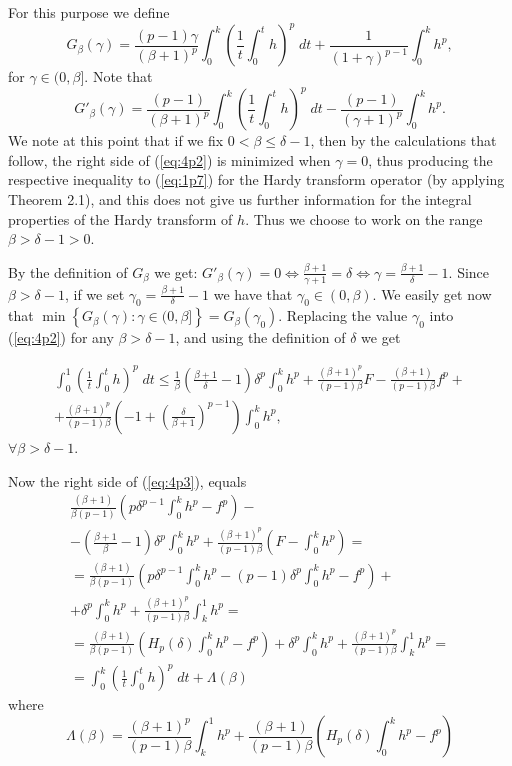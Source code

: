 \documentclass{article}
\numberwithin{equation}{section}
\theoremstyle{definition}
\theoremstyle{remark}
\begin{document}
For this purpose we define
\[
G_{\beta}(\gamma)= \frac{(p-1)\gamma}{(\beta+1)^p} \int_0^k\left(\frac{1}{t} \int_0^t h \right)^p\; dt + \frac{1}{(1+\gamma)^{p-1}}\int_0^k h^p,
\]
for $\gamma\in  (0,\beta]$. Note that
\[
G'_{\beta}(\gamma)= \frac{(p-1)}{(\beta+1)^p} \int_0^k\left(\frac{1}{t} \int_0^t h \right)^p\; dt - \frac{(p-1)}{(\gamma+1)^p}\int_0^k h^p.
\]
We note at this point that if we fix $0<\beta\leq\delta-1$, then by the calculations that follow, the right side of (\ref{eq:4p2}) is minimized when $\gamma=0$, thus producing the respective inequality to (\ref{eq:1p7}) for the Hardy transform operator (by applying Theorem 2.1), and this does not give us further information for the integral properties of the Hardy transform of $h$. Thus we choose to work on the range $\beta>\delta-1>0$.    

By the definition of $G_{\beta}$ we get: $G'_{\beta}(\gamma)=0 \Leftrightarrow \frac{\beta+1}{\gamma+1}=\delta \Leftrightarrow \gamma = \frac{\beta+1}{\delta}-1$.
Since $\beta > \delta-1$, if we set $\gamma_0=\frac{\beta+1}{\delta}-1$ we have that $\gamma_0\in (0,\beta)$. We easily get now that $\min \left\lbrace G_{\beta}(\gamma): \gamma\in (0,\beta]\right\rbrace = G_{\beta}(\gamma_0)$. Replacing the value $\gamma_0$ into (\ref{eq:4p2}) for any $\beta> \delta-1$, and using the definition of $\delta$ we get

\begin{multline} \label{eq:4p3}
\int_0^1\left(\frac{1}{t} \int_0^t h \right)^p\; dt \leq \frac{1}{\beta} \left( \frac{\beta+1}{\delta}-1\right)\delta^p\int_0^k h^p+ \frac{(\beta+1)^p}{(p-1)\beta}F- \frac{(\beta+1)}{(p-1)\beta}f^p+\\
+ \frac{(\beta+1)^p}{(p-1)\beta}\left( -1 +\left(\frac{\delta}{\beta+1} \right)^{p-1} \right)\int_0^k h^p,
\end{multline}
$\forall \beta>\delta-1$.

Now the right side of (\ref{eq:4p3}), equals
\begin{multline*}
\frac{(\beta+1)}{\beta(p-1)}\left( p\delta^{p-1} \int_0^k h^p -f^p \right)-\\
-\left(\frac{\beta+1}{\beta}-1 \right)\delta^p \int_0^k h^p+ \frac{(\beta+1)^p}{(p-1)\beta}\left(F-\int_0^k h^p \right)=\\
= \frac{(\beta+1)}{\beta(p-1)} \left(p\delta^{p-1}\int_0^k h^p- (p-1)\delta^p \int_0^k h^p-f^p \right)+\\
+\delta^p \int_0^k h^p + \frac{(\beta+1)^p}{(p-1)\beta}\int_k^1 h^p=\\
= \frac{(\beta+1)}{\beta(p-1)} \left(H_{p}(\delta) \int_0^k h^p -f^p\right)+ \delta^p \int_0^k h^p + \frac{(\beta+1)^p}{(p-1)\beta} \int_k^1 h^p=\\
=\int_0^k \left(\frac{1}{t} \int_0^t h \right)^p\; dt + \Lambda(\beta)
\end{multline*}
where
\begin{equation}\label{eq:4p4}
\Lambda(\beta)=\frac{(\beta+1)^p}{(p-1)\beta}\int_k^1 h^p + \frac{(\beta+1)}{(p-1)\beta} \left(H_{p}(\delta) \int_0^k h^p -f^p\right)
\end{equation}
\end{document}
